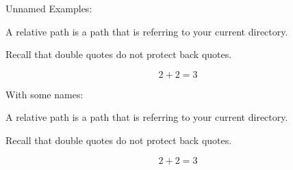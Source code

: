 Unnamed Examples:

\begin{defn}
	A relative path is a path that is referring to your current directory.
\end{defn}

\begin{rem}
	Recall that double quotes do not protect back quotes.
\end{rem}

\begin{exmp}
	$$2+2=3$$
\end{exmp}

With some names:
\begin{defn}
    A relative path is a path that is referring to your current directory.
\end{defn}

\begin{rem}
    Recall that double quotes do not protect back quotes.
\end{rem}

\begin{exmp}[Addition]
    $$2+2=3$$
\end{exmp}